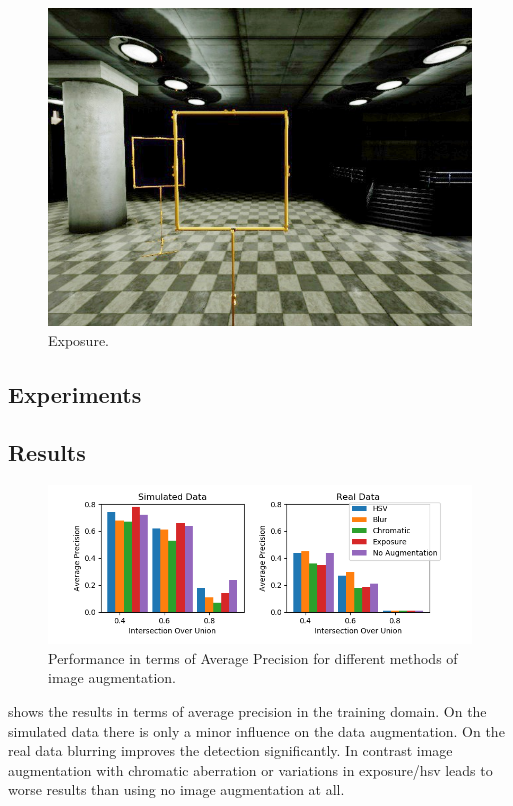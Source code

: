 \begin{figure}[htbp]
\begin{minipage}{0.33\textwidth}
		\includegraphics[width=\textwidth]{fig/gate_example_exposure}
		\caption{Exposure.}
		\label{fig:exposure}
	\end{minipage}
\end{figure}



\subsection{Experiments}
\subsection{Results}

\begin{figure}[htbp]
	\centering
	\includegraphics[width=\textwidth]{fig/pp_bar}
	\caption{Performance in terms of Average Precision for different methods  of image augmentation.}
	\label{fig:pp_bar}
\end{figure}

 shows the results in terms of average precision in the training domain. On the simulated data there is only a minor influence on the data augmentation. On the real data blurring improves the detection significantly. In contrast image augmentation with chromatic aberration or variations in exposure/hsv leads to worse results than using no image augmentation at all.

